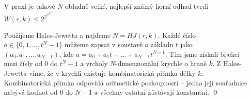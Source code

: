 V praxi je takové $N$ obludně velké, nejlepší známý horní odhad tvrdí $W(r,k) \le 2^{2^{r^{2^{2^{k+9}}}}}$.

\dk Použijeme Hales-Jewetta a najdeme $N = HJ(r,k)$. Každé číslo $a \in \{0, 1, \dots, t^N-1\}$ můžeme zapsat v soustavě o základu $t$ jako $(a_0,a_1,\dots,a_{N-1})$, kde $a = a_0 + a_1t + \dots + a_{N-1}t^{N-1}$. Tím jsme získali bijekci mezi čísly od 0 do $t^N-1$ a vrcholy $N$-dimenzionální krychle o hraně $k$. Z Hales-Jewetta víme, že v krychli existuje kombinatorická přímka délky $k$. Kombinatorická přímka odpovídá aritmetické posloupnosti -- jedna její souřadnice nabývá hodnot od 0 do $N-1$ a všechny ostatní zůstávají konstantní.
\qed

